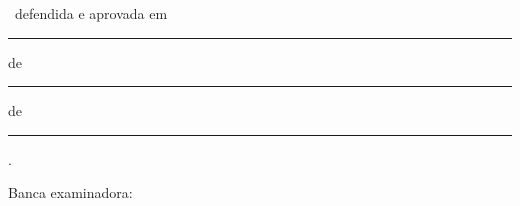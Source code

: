 
\begin{folhadeaprovacao}
  \begin{center}
    {\ABNTEXchapterfont\large\imprimirautor}

    \vspace*{\fill}
    {\ABNTEXchapterfont\bfseries\Large\imprimirtitulo}
    \vspace*{\fill}

    \hspace{.45\textwidth}
    \begin{minipage}{.5\textwidth}
        \imprimirpreambulo
    \end{minipage}
    \vspace*{\fill}
  \end{center}

  \begin{center}
    \imprimirtipotrabalho\ defendida e aprovada em \rule{2cm}{0.4pt} de \rule{3cm}{0.4pt} de \rule{2cm}{0.4pt}.

    Banca examinadora:
  \end{center}


\end{folhadeaprovacao}
